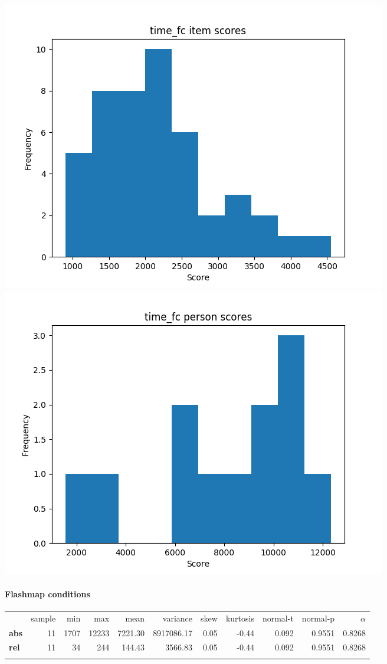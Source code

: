 \documentclass[]{article}
\begin{document}
\includegraphics{time_fc_diff.png} \includegraphics{time_fc_abil.png}

\FloatBarrier
\paragraph{Flashmap conditions}\label{flashmap-conditions-2}

\begin{longtable}[c]{@{}lrrrrrrrrrr@{}}
\toprule\addlinespace
& sample & min & max & mean & variance & skew & kurtosis & normal-t &
normal-p & $\alpha$
\\\addlinespace
\midrule\endhead
\textbf{abs} & 11 & 1707 & 12233 & 7221.30 & 8917086.17 & 0.05 & -0.44 &
0.092 & 0.9551 & 0.8268
\\\addlinespace
\textbf{rel} & 11 & 34 & 244 & 144.43 & 3566.83 & 0.05 & -0.44 & 0.092 &
0.9551 & 0.8268
\\\addlinespace
\bottomrule
\end{longtable}
\end{document}
